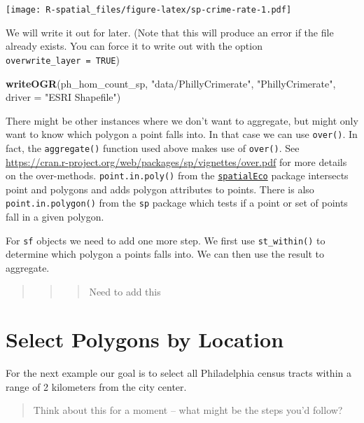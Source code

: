 \documentclass[]{book}
\newenvironment{Shaded}{\begin{snugshade}}{\end{snugshade}}
\newcommand{\KeywordTok}[1]{\textcolor[rgb]{0.13,0.29,0.53}{\textbf{#1}}}
\newcommand{\DataTypeTok}[1]{\textcolor[rgb]{0.13,0.29,0.53}{#1}}
\newcommand{\StringTok}[1]{\textcolor[rgb]{0.31,0.60,0.02}{#1}}
\newcommand{\NormalTok}[1]{#1}
\theoremstyle{definition}
\theoremstyle{definition}
\theoremstyle{definition}
\theoremstyle{remark}
\begin{document}
\texttt{[image: R-spatial\_files/figure-latex/sp-crime-rate-1.pdf]}

We will write it out for later. (Note that this will produce an error if
the file already exists. You can force it to write out with the option
\texttt{overwrite\_layer\ =\ TRUE})

\begin{Shaded}
\begin{Highlighting}[]
\KeywordTok{writeOGR}\NormalTok{(ph_hom_count_sp, }\StringTok{"data/PhillyCrimerate"}\NormalTok{, }\StringTok{"PhillyCrimerate"}\NormalTok{, }\DataTypeTok{driver =} \StringTok{"ESRI Shapefile"}\NormalTok{)}
\end{Highlighting}
\end{Shaded}

There might be other instances where we don't want to aggregate, but
might only want to know which polygon a point falls into. In that case
we can use \texttt{over()}. In fact, the \texttt{aggregate()} function
used above makes use of \texttt{over()}. See
\url{https://cran.r-project.org/web/packages/sp/vignettes/over.pdf} for
more details on the over-methods. \texttt{point.in.poly()} from the
\href{https://cran.r-project.org/package=spatialEco}{\texttt{spatialEco}}
package intersects point and polygons and adds polygon attributes to
points. There is also \texttt{point.in.polygon()} from the \texttt{sp}
package which tests if a point or set of points fall in a given polygon.

For \texttt{sf} objects we need to add one more step. We first use
\texttt{st\_within()} to determine which polygon a points falls into. We
can then use the result to aggregate.

\begin{quote}
\begin{quote}
\begin{quote}
Need to add this
\end{quote}
\end{quote}
\end{quote}

\section{Select Polygons by Location}\label{select-polygons-by-location}

For the next example our goal is to select all Philadelphia census
tracts within a range of 2 kilometers from the city center.

\begin{quote}
Think about this for a moment -- what might be the steps you'd follow?
\end{quote}
\end{document}
